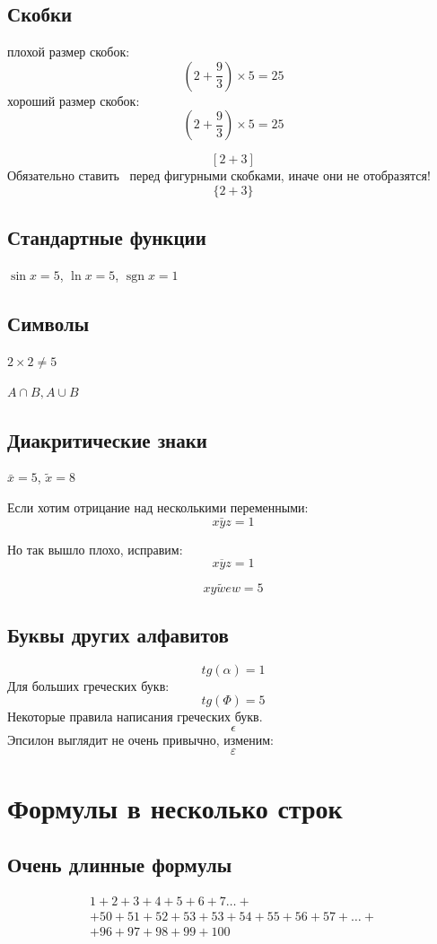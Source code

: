 \documentclass[a4paper, 12pt]{article}
\DeclareMathOperator{\sgn}{\mathop{sgn}}
\begin{document}
\subsection{Скобки}
плохой размер скобок:
\[(2 + \frac{9}{3})\times 5 = 25\]
хороший размер скобок:
\[\left(2 + \frac{9}{3}\right)\times 5 = 25\]

\[[2+3]\]
Обязательно ставить \ перед фигурными скобками, иначе они не отобразятся!
\[\{2+3\}\]

\subsection{Стандартные функции}

$\sin x = 5$, 
$\ln x = 5$,
$\sgn x = 1$

\subsection{Символы}\label{symbols}

$2\times 2 \ne 5$

$A \cap B,A \cup B$

\subsection{Диакритические знаки}

$\bar x =5$, $\tilde{x} = 8$

Если хотим отрицание над несколькими переменными:
\[\bar{xyz} = 1\]

Но так вышло плохо, исправим:
\[\overline{xyz} = 1\]

\[\widetilde{xywew} = 5\]

\subsection{Буквы других алфавитов}

\[tg(\alpha) = 1\]
Для больших греческих букв:
\[tg(\Phi) = 5\]
Некоторые правила написания греческих букв.
\[\epsilon\]
Эпсилон выглядит не очень привычно, изменим:
\[\varepsilon\]

\section{Формулы в несколько строк}

\subsection{Очень длинные формулы}
\begin{multline}
1+2+3+4+5+6+7 \dots + \\ + 50 + 51 + 52 + 53 + 53 + 54 + 55+ 56 + 57 + \dots + \\ + 96 + 97 + 98 + 99 + 100
\end{multline} 
\end{document}
